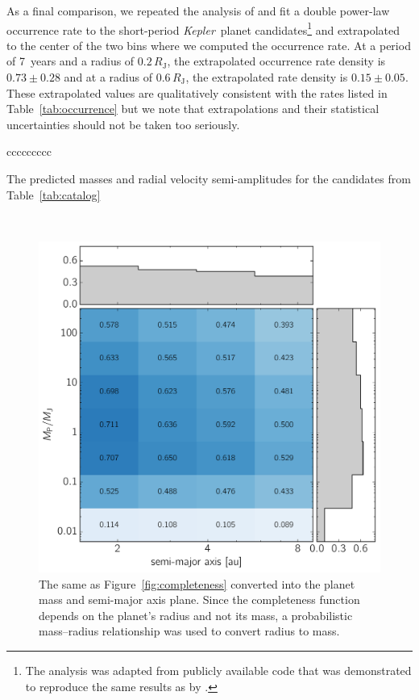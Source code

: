 \documentclass[manuscript, letterpaper]{aastex6}
\newcommand{\project}[1]{\textsl{#1}}
\newcommand{\kepler}{\project{Kepler}}
\newcommand{\dfmfigref}[1]{\ref{fig:#1}}
\newcommand{\dfmFig}[1]{Figure~\dfmfigref{#1}}
\newcommand{\dfmfig}[1]{\dfmFig{#1}}
\newcommand{\dfmfiglabel}[1]{\label{fig:#1}}
\begin{document}
As a final comparison, we repeated the analysis of \citet{Burke:2015} and fit
a double power-law occurrence rate to the short-period \kepler\ planet
candidates\footnote{The analysis was adapted from publicly available code that
was demonstrated to reproduce the same results as \citet{Burke:2015} by
\citet{Foreman-Mackey:2015a}.} and extrapolated to the center of the two bins
where we computed the occurrence rate.
At a period of 7~years and a radius of $0.2\,R_\mathrm{J}$, the extrapolated
occurrence rate density is $0.73\pm0.28$ and at a radius of
$0.6\,R_\mathrm{J}$, the extrapolated rate density is $0.15\pm0.05$.
These extrapolated values are qualitatively consistent with the rates listed
in Table~\ref{tab:occurrence} but we note that extrapolations and their
statistical uncertainties should not be taken too seriously.


\begin{floattable}
\begin{deluxetable}{ccccccccc}
\tabletypesize{\scriptsize}
\caption{The predicted masses and radial velocity semi-amplitudes for the
candidates from Table~\ref{tab:catalog} \label{tab:masses}}

\end{deluxetable}
\end{floattable}

\begin{figure}[p]~\\
\begin{center}
\includegraphics[width=\textwidth]{figures/completeness-am.pdf}
\end{center}
\caption{%
The same as \dfmfig{completeness} converted into the planet mass and
semi-major axis plane.
Since the completeness function depends on the planet's radius and not its
mass, a probabilistic mass--radius relationship \citep{Chen:2016} was used to
convert radius to mass.
\dfmfiglabel{completeness-am}}
\end{figure}
\end{document}
